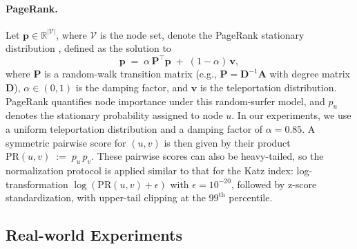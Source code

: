 \documentclass{article}
\theoremstyle{plain}
\theoremstyle{definition}
\theoremstyle{remark}
\begin{document}
\paragraph{PageRank.}
Let \(\mathbf{p}\in\mathbb{R}^{|\mathcal{V}|}\), where \(\mathcal{V}\) is the node set, denote the PageRank stationary distribution \cite{brin_anatomy_1998}, defined as the solution to
\begin{equation}
\mathbf{p} \;=\; \alpha\,\mathbf{P}^{\top}\mathbf{p} \;+\; (1-\alpha)\,\mathbf{v},
\end{equation}
where \(\mathbf{P}\) is a random-walk transition matrix (e.g., \(\mathbf{P}=\mathbf{D}^{-1}\mathbf{A}\) with degree matrix \(\mathbf{D}\)), \(\alpha\in(0,1)\) is the damping factor, and \(\mathbf{v}\) is the teleportation distribution. PageRank quantifies node importance under this random-surfer model, and \(p_u\) denotes the stationary probability assigned to node \(u\). In our experiments, we use a uniform teleportation distribution and a damping factor of \(\alpha=0.85\). A symmetric pairwise score for \((u,v)\) is then given by their product
\(
\mathrm{PR}(u,v) \;:=\; p_u\,p_v.
\)
These pairwise scores can also be heavy-tailed, so the normalization protocol is applied similar to that for the Katz index: log-transformation \(\log(\mathrm{PR}(u,v)+\epsilon)\) with \(\epsilon=10^{-20}\), followed by z-score standardization, with upper-tail clipping at the \(99^{\text{th}}\) percentile.

\subsection{Real-world Experiments} \label{app:real-world-experiments}
\end{document}
